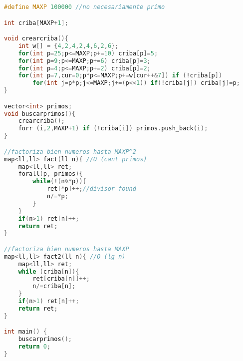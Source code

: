 \begin{lstlisting}[language=C++]
#define MAXP 100000	//no necesariamente primo

int criba[MAXP+1];

void crearcriba(){
	int w[] = {4,2,4,2,4,6,2,6};
	for(int p=25;p<=MAXP;p+=10) criba[p]=5;
	for(int p=9;p<=MAXP;p+=6) criba[p]=3; 
	for(int p=4;p<=MAXP;p+=2) criba[p]=2;
	for(int p=7,cur=0;p*p<=MAXP;p+=w[cur++&7]) if (!criba[p]) 
		for(int j=p*p;j<=MAXP;j+=(p<<1)) if(!criba[j]) criba[j]=p;
}

vector<int> primos;
void buscarprimos(){
	crearcriba();
	forr (i,2,MAXP+1) if (!criba[i]) primos.push_back(i);
}

//factoriza bien numeros hasta MAXP^2
map<ll,ll> fact(ll n){ //O (cant primos)
	map<ll,ll> ret;
	forall(p, primos){
		while(!(n%*p)){
			ret[*p]++;//divisor found
			n/=*p;
		}
	}
	if(n>1) ret[n]++;
	return ret;
}

//factoriza bien numeros hasta MAXP
map<ll,ll> fact2(ll n){ //O (lg n)
	map<ll,ll> ret;
	while (criba[n]){
		ret[criba[n]]++;
		n/=criba[n];
	}
	if(n>1) ret[n]++;
	return ret;
}

int main() {
	buscarprimos();
	return 0;
}
\end{lstlisting}
